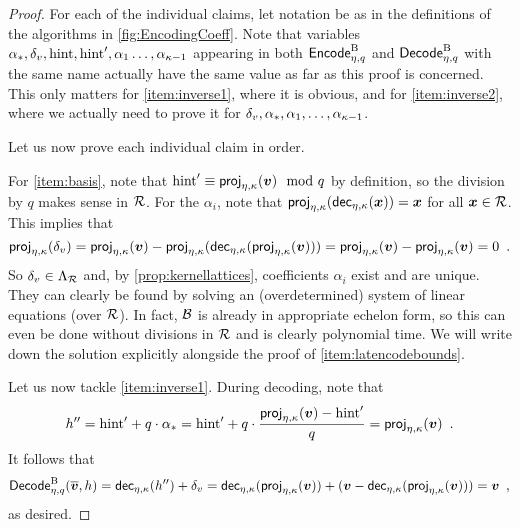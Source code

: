 \begin{proof}
For each of the individual claims, let notation be as in the definitions of the algorithms in \autoref{fig:EncodingCoeff}.
Note that variables $\alpha_{\ast},\delta_v, \mathrm{hint}, \mathrm{hint}', \alpha_1\ldots,\alpha_{\kappa-1}$ appearing in both $\mathsf{Encode}^{\textup{B}}_{\eta,q}$ and $\mathsf{Decode}^{\textup{B}}_{\eta,q}$ with the same name actually have the same value as far as this proof is concerned.
This only matters for \autoref{item:inverse1}, where it is obvious, and for \autoref{item:inverse2}, where we actually need to prove it for $\delta_v, \alpha_{\ast},\alpha_1,\ldots,\alpha_{\kappa-1}$.

\medskip\noindent
Let us now prove each individual claim in order.

\bigskip\noindent
For \autoref{item:basis}, note that $\mathrm{hint}' \equiv \mathsf{proj}_{\eta,\kappa}(\boldsymbol{v}) \mod q$ by definition, so the division by $q$ makes sense in $\mathcal{R}$.
For the $\alpha_i$, note that $\mathsf{proj}_{\eta,\kappa}(\mathsf{dec}_{\eta,\kappa}(\boldsymbol{x})) = \boldsymbol{x}$ for all $\boldsymbol{x}\in\mathcal{R}$. This implies that
\[
 \mathsf{proj}_{\eta,\kappa}(\delta_v) = \mathsf{proj}_{\eta,\kappa}(\boldsymbol{v}) - \mathsf{proj}_{\eta,\kappa}(\mathsf{dec}_{\eta,\kappa}(\mathsf{proj}_{\eta,\kappa}(\boldsymbol{v}))) = \mathsf{proj}_{\eta,\kappa}(\boldsymbol{v}) - \mathsf{proj}_{\eta,\kappa}(\boldsymbol{v}) = 0\enspace.
\]
So $\delta_v\in\Lambda_{\mathcal{R}}$ and, by \autoref{prop:kernellattices}, coefficients $\alpha_i$ exist and are unique.
They can clearly be found by solving an (overdetermined) system of linear equations (over $\mathcal{R}$).
In fact, $\mathcal{B}$ is already in appropriate echelon form, so this can even be done without divisions in $\mathcal{R}$ and is clearly polynomial time. We will write down the solution explicitly alongside the proof of \autoref{item:latencodebounds}.

\bigskip\noindent
Let us now tackle \autoref{item:inverse1}.
During decoding, note that
\[
 h'' = \mathrm{hint}' + q\cdot\alpha_{\ast} = \mathrm{hint}'+q\cdot\frac{\mathsf{proj}_{\eta,\kappa}(\boldsymbol{v})-\mathrm{hint}'}{q} = \mathsf{proj}_{\eta,\kappa}(\boldsymbol{v})\enspace.
\]
It follows that
\[
 \mathsf{Decode}^{\textup{B}}_{\eta,q}(\overline{\boldsymbol{v}}, h) = \mathsf{dec}_{\eta,\kappa}(h'') + \delta_v = \mathsf{dec}_{\eta,\kappa}(\mathsf{proj}_{\eta,\kappa}(\boldsymbol{v})) + (\boldsymbol{v} - \mathsf{dec}_{\eta,\kappa}(\mathsf{proj}_{\eta,\kappa}(\boldsymbol{v}))) = \boldsymbol{v}\enspace,
\]
as desired.



\end{proof}
